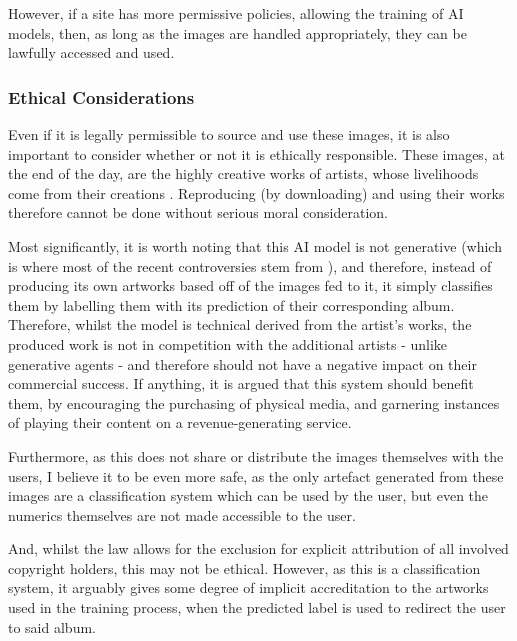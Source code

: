                   However, if a site has more permissive policies, allowing the training of AI models, then, as long as the images are handled appropriately, they can be lawfully accessed and used.
    
              \subsubsection{Ethical Considerations}
    
                  Even if it is legally permissible to source and use these images, it is also important to consider whether or not it is ethically responsible. These images, at the end of the day, are the highly creative works of artists, whose livelihoods come from their creations \cite{heikkila2022ai_art}. Reproducing (by downloading) and using their works therefore cannot be done without serious moral consideration.
    
                  Most significantly, it is worth noting that this AI model is not generative (which is where most of the recent controversies stem from \cite{apnews2025mccartney_ai_warning}), and therefore, instead of producing its own artworks based off of the images fed to it, it simply classifies them by labelling them with its prediction of their corresponding album. Therefore, whilst the model is technical derived from the artist's works, the produced work is not in competition with the additional artists - unlike generative agents \cite{times2025photographer_ai_copy} - and therefore should not have a negative impact on their commercial success. If anything, it is argued that this system should benefit them, by encouraging the purchasing of physical media, and garnering instances of playing their content on a revenue-generating service.
    
                  Furthermore, as this does not share or distribute the images themselves with the users, I believe it to be even more safe, as the only artefact generated from these images are a classification system which can be used by the user, but even the numerics themselves are not made accessible to the user.
    
                  And, whilst the law allows for the exclusion for explicit attribution of all involved copyright holders, this may not be ethical. However, as this is a classification system, it arguably gives some degree of implicit accreditation to the artworks used in the training process, when the predicted label is used to redirect the user to said album.
    
